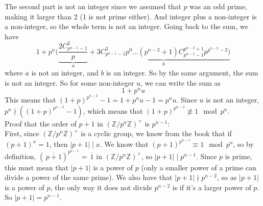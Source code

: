 \documentclass[12pt]{article}
\newcommand{\Z}{\mathbb{Z}}
\newcommand{\olsi}[1]{\,\overline{\!{#1}}}
\begin{document}
    The second part is not an integer since we assumed that
    $p$ was an odd prime, making it larger than 2
    (1 is not prime either).
    And integer plus a non-integer is a non-integer,
    so the whole term is not an integer.
    Going back to the sum, we have 
    \[1 + p^n( \underbrace{\dfrac{ 2C_{p^{n-1} - 1}^{2}}{p}}_{a}
    + \underbrace{3C_{p^{n-1} - 1}^{3}p^{0} \dots
    (p^{n-2}+1)C_{p^{n-2} - 1}^{p^{n-2} + 1}p^{p^{n-2}-2})}_{b} \]
    where $a$ is not an integer, and $b$ is an integer.
    So by the same argument, the sum is not an integer.
    So for some non-integer $u$, we can write the sum as
    \[1 + p^nu\]
    This means that $(1 + p)^{p^{n-2}} - 1 = 1 + p^nu - 1
    = p^nu$.
    Since $u$ is not an integer, $p^n \nmid ((1 + p)^{p^{n-2}} - 1)$,
    which means that $(1 + p)^{p^{n-2}} \not\equiv 1 \mod p^n$. \\
    Proof that the order of $p + 1$
    in $(\Z/p^n\Z)^\times$ is $p^{n-1}$: \\
    First, since $(\Z/p^n\Z)^\times$ is a cyclic group,
    we know from the book that if $(p + 1)^x = 1$,
    then $|p + 1| \mid x$.
    We know that $(p + 1)^{p^{n-1}} \equiv 1 \mod p^n$,
    so by definition, $(\olsi{p + 1})^{p^{n-1}} = \olsi{1}$
    in $(\Z/p^n\Z)^\times$,
    so $|p + 1| \mid p^{n-1}$.
    Since $p$ is prime, this must mean that $|p+1|$ is a power of $p$
    (only a smaller power of a prime can divide a power of the same prime).
    We also have that $|p + 1| \nmid p^{n-2}$,
    so as $|p+1|$ is a power of $p$,
    the only way it does not divide $p^{n-2}$ is if it's
    a larger power of $p$.
    So $|p + 1| = p^{n-1}$.
\end{document}

